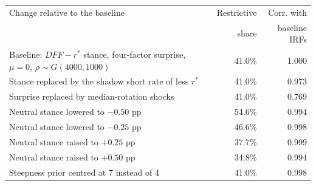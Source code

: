 %
%
%
\begin{tabular}{lrr}
\hline\hline
Change relative to the baseline & Restrictive & Corr. with \\
 & share & baseline IRFs \\
\hline
Baseline: $DFF-r^\ast$ stance, four-factor surprise, $\mu=0$, $\rho\sim G(4000,1000)$ & 41.0\% & 1.000 \\ %
Stance replaced by the shadow short rate of \cite{krippner2013ssr, krippner2015zlb} less $r^\ast$ & 41.0\% & 0.973 \\ %
Surprise replaced by \cite{jarocinski2020deconstructing} median-rotation shocks & 41.0\% & 0.769 \\ %
Neutral stance lowered to $-0.50$ pp & 54.6\% & 0.994 \\ %
Neutral stance lowered to $-0.25$ pp & 46.6\% & 0.998 \\ %
Neutral stance raised to $+0.25$ pp & 37.7\% & 0.999 \\ %
Neutral stance raised to $+0.50$ pp & 34.8\% & 0.994 \\ %
Steepness prior centred at $7$ instead of $4$ & 41.0\% & 0.998 \\ %
\hline\hline
\end{tabular}
